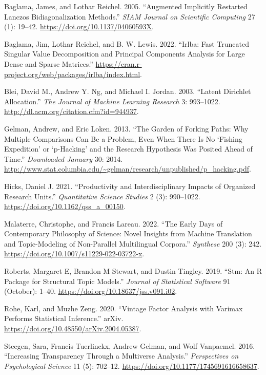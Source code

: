 \documentclass[
]{article}
\newlength{\cslhangindent}
\newlength{\cslentryspacingunit} %
\newenvironment{CSLReferences}[2] %
 {%
  \setlength{\parindent}{0pt}
  \ifodd #1
  \let\oldpar\par
  \def\par{\hangindent=\cslhangindent\oldpar}
  \fi
  \setlength{\parskip}{#2\cslentryspacingunit}
 }%
 {}
\begin{document}
\hypertarget{refs}{}
\begin{CSLReferences}{1}{0}
\leavevmode{}%
Baglama, James, and Lothar Reichel. 2005. {``Augmented Implicitly
Restarted Lanczos Bidiagonalization Methods.''} \emph{SIAM Journal on
Scientific Computing} 27 (1): 19--42.
\url{https://doi.org/10.1137/04060593X}.

\leavevmode{}%
Baglama, Jim, Lothar Reichel, and B. W. Lewis. 2022. {``Irlba: Fast
Truncated Singular Value Decomposition and Principal Components Analysis
for Large Dense and Sparse Matrices.''}
\url{https://cran.r-project.org/web/packages/irlba/index.html}.

\leavevmode{}%
Blei, David M., Andrew Y. Ng, and Michael I. Jordan. 2003. {``Latent
Dirichlet Allocation.''} \emph{The Journal of Machine Learning Research}
3: 993--1022. \url{http://dl.acm.org/citation.cfm?id=944937}.

\leavevmode{}%
Gelman, Andrew, and Eric Loken. 2013. {``The Garden of Forking Paths:
Why Multiple Comparisons Can Be a Problem, Even When There Is No
{`Fishing Expedition'} or {`p-Hacking'} and the Research Hypothesis Was
Posited Ahead of Time.''} \emph{Downloaded January} 30: 2014.
\url{http://www.stat.columbia.edu/~gelman/research/unpublished/p_hacking.pdf}.

\leavevmode{}%
Hicks, Daniel J. 2021. {``Productivity and Interdisciplinary Impacts of
Organized Research Units.''} \emph{Quantitative Science Studies} 2 (3):
990--1022. \url{https://doi.org/10.1162/qss_a_00150}.

\leavevmode{}%
Malaterre, Christophe, and Francis Lareau. 2022. {``The Early Days of
Contemporary Philosophy of Science: Novel Insights from Machine
Translation and Topic-Modeling of Non-Parallel Multilingual Corpora.''}
\emph{Synthese} 200 (3): 242.
\url{https://doi.org/10.1007/s11229-022-03722-x}.

\leavevmode{}%
Roberts, Margaret E, Brandon M Stewart, and Dustin Tingley. 2019.
{``Stm: An R Package for Structural Topic Models.''} \emph{Journal of
Statistical Software} 91 (October): 1--40.
\url{https://doi.org/10.18637/jss.v091.i02}.

\leavevmode{}%
Rohe, Karl, and Muzhe Zeng. 2020. {``Vintage Factor Analysis with
Varimax Performs Statistical Inference.''} arXiv.
\url{https://doi.org/10.48550/arXiv.2004.05387}.

\leavevmode{}%
Steegen, Sara, Francis Tuerlinckx, Andrew Gelman, and Wolf Vanpaemel.
2016. {``Increasing Transparency Through a Multiverse Analysis.''}
\emph{Perspectives on Psychological Science} 11 (5): 702--12.
\url{https://doi.org/10.1177/1745691616658637}.

\end{CSLReferences}
\end{document}
